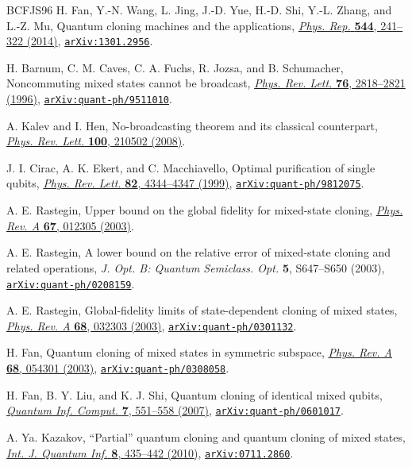 \documentclass[11pt]{article}
\theoremstyle{remark}
\theoremstyle{plain}
\newcommand{\doi}[2]{\href{https://doi.org/#1}{#2}}
\newcommand{\arxiv}[1]{\href{https://arxiv.org/abs/#1}{\texttt{arXiv:#1}}}
\begin{document}
\begin{thebibliography}{BCFJS96}
H. Fan, Y.-N. Wang, L. Jing, J.-D. Yue, H.-D. Shi, Y.-L. Zhang, and L.-Z. Mu,
Quantum cloning machines and the applications,
\doi{10.1016/j.physrep.2014.06.004}{\emph{Phys. Rep.} \textbf{544}, 241--322 (2014)},
\arxiv{1301.2956}.

H. Barnum, C. M. Caves, C. A. Fuchs, R. Jozsa, and B. Schumacher,
Noncommuting mixed states cannot be broadcast,
\doi{10.1103/PhysRevLett.76.2818}{\emph{Phys. Rev. Lett.} \textbf{76}, 2818--2821 (1996)},
\arxiv{quant-ph/9511010}.

A. Kalev and I. Hen,
No-broadcasting theorem and its classical counterpart,
\doi{10.1103/PhysRevLett.100.210502}{\emph{Phys. Rev. Lett.} \textbf{100},
210502 (2008)}.

J. I. Cirac, A. K. Ekert, and C. Macchiavello,
Optimal purification of single qubits,
\doi{10.1103/PhysRevLett.82.4344}{\emph{Phys. Rev. Lett.} \textbf{82}, 4344--4347 (1999)},
\arxiv{quant-ph/9812075}.

A. E. Rastegin,
Upper bound on the global fidelity for mixed-state cloning,
\doi{10.1103/PhysRevA.67.012305}{\emph{Phys. Rev. A} \textbf{67}, 012305 (2003)}.

A. E. Rastegin,
A lower bound on the relative error of mixed-state cloning and related operations,
\emph{J. Opt. B: Quantum Semiclass. Opt.} \textbf{5}, S647--S650 (2003),
\arxiv{quant-ph/0208159}.

A. E. Rastegin,
Global-fidelity limits of state-dependent cloning of mixed states,
\doi{10.1103/PhysRevA.68.032303}{\emph{Phys. Rev. A} \textbf{68}, 032303 (2003)},
\arxiv{quant-ph/0301132}.

H. Fan,
Quantum cloning of mixed states in symmetric subspace,
\doi{10.1103/PhysRevA.68.054301}{\emph{Phys. Rev. A} \textbf{68}, 054301 (2003)},
\arxiv{quant-ph/0308058}.

H. Fan, B. Y. Liu, and K. J. Shi,
Quantum cloning of identical mixed qubits,
\doi{10.26421/QIC7.5-6-8}{\emph{Quantum Inf. Comput.} \textbf{7}, 551--558 (2007)},
\arxiv{quant-ph/0601017}.

A. Ya. Kazakov,
``Partial'' quantum cloning and quantum cloning of mixed states,
\doi{10.1142/S0219749910006186}{\emph{Int. J. Quantum Inf.}
\textbf{8}, 435--442 (2010)},
\arxiv{0711.2860}.


\end{thebibliography}
\end{document}
